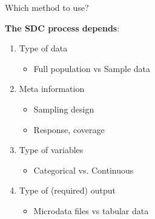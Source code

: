 \documentclass[
	aspectratio = 169
 ]{beamer}
\begin{document}
\begin{frame}{Which method to use?}

\textbf{The SDC process depends}:
\vspace{1em}

\begin{enumerate}
    \item Type of data
        \normalsize
        \begin{itemize}
            \normalsize
            \item Full population vs Sample data
        \end{itemize}
    \item Meta information
        \begin{itemize}
            \normalsize
            \item Sampling design
            \item Response, coverage
        \end{itemize}
    \item Type of variables
        \begin{itemize}
            \normalsize
            \item Categorical vs. Continuous
        \end{itemize}
    \item Type of (required) output
        \begin{itemize}
            \normalsize
            \item Microdata files vs tabular data
        \end{itemize}
\end{enumerate}

\end{frame}
\end{document}

